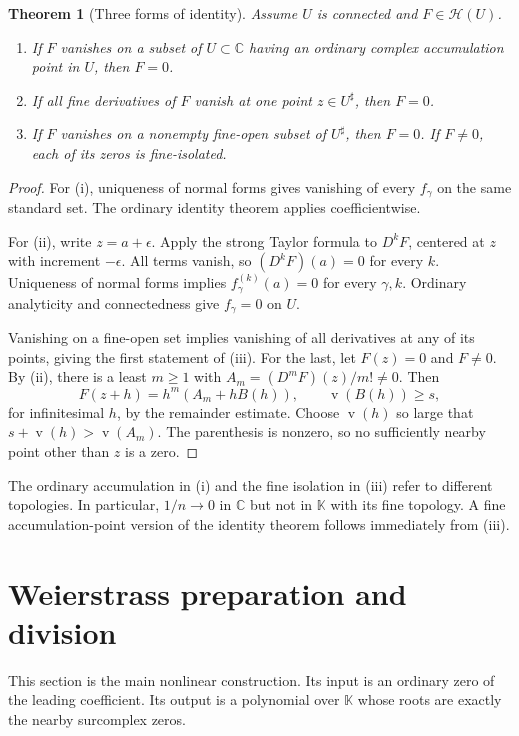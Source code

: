 \documentclass[11pt,letterpaper]{article}
\numberwithin{equation}{section}
\newtheorem{theorem}{Theorem}[section]
\theoremstyle{definition}
\theoremstyle{remark}
\newcommand{\K}{\mathbb{K}}
\newcommand{\C}{\mathbb{C}}
\newcommand{\HH}{\mathcal{H}}
\newcommand{\val}{\operatorname{v}}
\begin{document}
\begin{theorem}[Three forms of identity]\label{thm:identity}
Assume $U$ is connected and $F\in\HH(U)$.
\begin{enumerate}[label=(\roman*)]
\item If $F$ vanishes on a subset of $U\subset\C$ having an ordinary complex
accumulation point in $U$, then $F=0$.
\item If all fine derivatives of $F$ vanish at one point $z\in U^\sharp$,
then $F=0$.
\item If $F$ vanishes on a nonempty fine-open subset of $U^\sharp$, then
$F=0$. If $F\ne0$, each of its zeros is fine-isolated.
\end{enumerate}
\end{theorem}
\begin{proof}
For (i), uniqueness of normal forms gives vanishing of every $f_\gamma$ on
the same standard set. The ordinary identity theorem applies coefficientwise.

For (ii), write $z=a+\epsilon$. Apply the strong Taylor formula to $D^kF$,
centered at $z$ with increment $-\epsilon$. All terms vanish, so
$(D^kF)(a)=0$ for every $k$. Uniqueness of normal forms implies
$f_\gamma^{(k)}(a)=0$ for every $\gamma,k$. Ordinary analyticity and
connectedness give $f_\gamma=0$ on $U$.

Vanishing on a fine-open set implies vanishing of all derivatives at any of
its points, giving the first statement of (iii). For the last, let $F(z)=0$
and $F\ne0$. By (ii), there is a least $m\ge1$ with
$A_m=(D^mF)(z)/m!\ne0$. Then
\[
 F(z+h)=h^m(A_m+hB(h)),\qquad \val(B(h))\ge s,
\]
for infinitesimal $h$, by the remainder estimate. Choose $\val(h)$ so large
that $s+\val(h)>\val(A_m)$. The parenthesis is nonzero, so no sufficiently
nearby point other than $z$ is a zero.
\end{proof}

The ordinary accumulation in (i) and the fine isolation in (iii) refer to
different topologies. In particular, $1/n\to0$ in $\C$ but not in $\K$ with
its fine topology. A fine accumulation-point version of the identity theorem
follows immediately from (iii).

\section{Weierstrass preparation and division}\label{sec:preparation}

This section is the main nonlinear construction. Its input is an ordinary
zero of the leading coefficient. Its output is a polynomial over $\K$ whose
roots are exactly the nearby surcomplex zeros.
\end{document}

